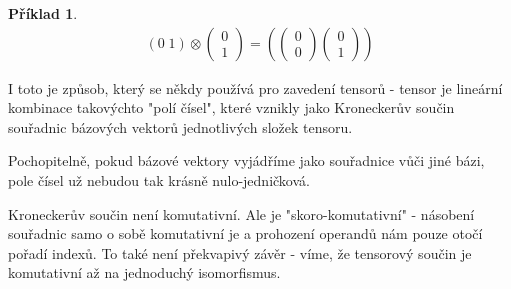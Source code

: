 \documentclass[a5paper,12pt]{amsbook}
\theoremstyle{definition}
\newtheorem{example}{Příklad}[chapter]
\begin{document}
\begin{example}
\begin{equation*}
\begin{split}
\left(0 \; 1\right)\otimes\left(\begin{array}{c}0 \\ 1\end{array}\right)
=\left(
\left(\begin{array}{c}0 \\ 0\end{array}\right)
\left(\begin{array}{c}0 \\ 1\end{array}\right)
\right)
\end{split}
\end{equation*}

\end{example}

\noindent
I toto je způsob, který se někdy používá pro zavedení tensorů - tensor je lineární
kombinace takovýchto "polí čísel", které vznikly jako Kroneckerův součin souřadnic
bázových vektorů jednotlivých složek tensoru.

Pochopitelně, pokud bázové vektory vyjádříme jako souřadnice vůči jiné bázi, pole čísel
už nebudou tak krásně nulo-jedničková.

Kroneckerův součin není komutativní. Ale je "skoro-komutativní" - násobení souřadnic
samo o sobě komutativní je a prohození operandů nám pouze otočí pořadí indexů. To také
není překvapivý závěr - víme, že tensorový součin je komutativní až na jednoduchý
isomorfismus.
\end{document}
